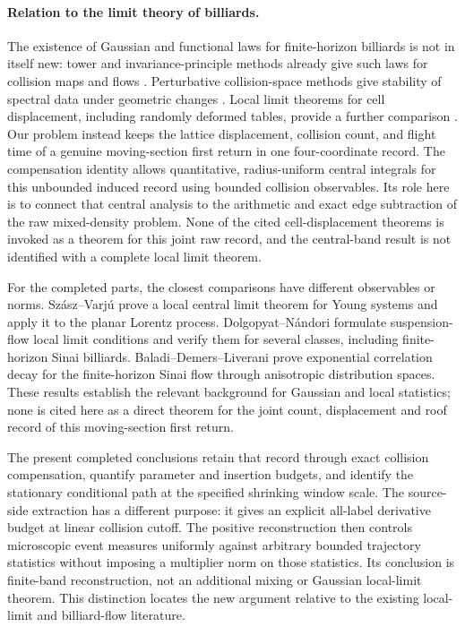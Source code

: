 \documentclass[11pt,reqno]{amsart}
\numberwithin{equation}{section}
\theoremstyle{definition}\newtheorem{definition}[theorem]{Definition}
\theoremstyle{remark}\newtheorem{remark}[theorem]{Remark}
\begin{document}
\paragraph{Relation to the limit theory of billiards.}
The existence of Gaussian and functional laws for finite-horizon
billiards is not in itself new: tower and invariance-principle methods
already give such laws for collision maps and flows
\cite{Young,MN}. Perturbative collision-space methods give stability of
spectral data under geometric changes \cite{DZ}. Local limit theorems
for cell displacement, including randomly deformed tables, provide a
further comparison \cite{SV,DPZ}. Our problem instead keeps the lattice
displacement, collision count, and flight time of a genuine moving-section
first return in one four-coordinate record. The compensation identity
allows quantitative, radius-uniform central integrals for this
unbounded induced record using bounded collision observables. Its role
here is to connect that central analysis to the arithmetic and exact
edge subtraction of the raw mixed-density problem. None of the cited
cell-displacement theorems is invoked as a theorem for this joint raw
record, and the central-band result is not identified with a complete
local limit theorem.

For the completed parts, the closest comparisons have different
observables or norms. Sz\'asz--Varj\'u \cite{SV} prove a local central
limit theorem for Young systems and apply it to the planar Lorentz
process. Dolgopyat--N\'andori \cite{DN} formulate suspension-flow local
limit conditions and verify them for several classes, including
finite-horizon Sinai billiards. Baladi--Demers--Liverani \cite{BDL}
prove exponential correlation decay for the finite-horizon Sinai flow
through anisotropic distribution spaces. These results establish the
relevant background for Gaussian and local statistics; none is cited
here as a direct theorem for the joint count, displacement and roof
record of this moving-section first return.

The present completed conclusions retain that record through exact
collision compensation, quantify parameter and insertion budgets, and
identify the stationary conditional path at the specified shrinking
window scale. The source-side extraction has a different purpose: it
gives an explicit all-label derivative budget at linear collision
cutoff. The positive reconstruction then controls microscopic event
measures uniformly against arbitrary bounded trajectory statistics
without imposing a multiplier norm on those statistics. Its conclusion
is finite-band reconstruction, not an additional mixing or Gaussian
local-limit theorem. This distinction locates the new argument relative
to the existing local-limit and billiard-flow literature.
\end{document}
